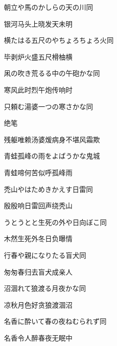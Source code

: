 \begin{haiku}
    {\FH 朝立や馬のかしらの天の川}\hfill{\FH 同}

    {\FK 银河马头上晓发天未明}
\end{haiku}

\begin{haiku}
    {\FH 横たはる五尺のやちょろちょろ火}\hfill{\FH 同}

    {\FK 毕剥炉火盛五尺榾柚横}
\end{haiku}

\begin{haiku}
    {\FH 凩の吹き荒るる中の午砲かな}\hfill{\FH 同}

    {\FK 寒风此时烈午炮传响时}
\end{haiku}

\begin{haiku}
    {\FH 只頼む湯婆一つの寒さかな}\hfill{\FH 同}

    {\FK 绝笔}

    {\FK 残躯唯赖汤婆煖病身不堪风霜欺}
\end{haiku}

\begin{haiku}
    {\FH 青蛙孤峰の雨をよばうかな}\hfill{\FH 鬼城}

    {\FK 青蛙啼何苦似呼孤峰雨}
\end{haiku}

\begin{haiku}
    {\FH 禿山やはためきかえす日雷}\hfill{\FH 同}

    {\FK 殷殷响日雷回声绕秃山}
\end{haiku}

\begin{haiku}
    {\FH うとうとと生死の外や日向ぼこ}\hfill{\FH 同}

    {\FK 木然生死外冬日负曝情}
\end{haiku}

\begin{haiku}
    {\FH 行春や親になりたる盲犬}\hfill{\FH 同}

    {\FK 匆匆春归去盲犬成亲人}
\end{haiku}

\begin{haiku}
    {\FH 沼涸れて狼渡る月夜かな}\hfill{\FH 同}

    {\FK 凉秋月色好贪狼渡涸沼}
\end{haiku}

\begin{haiku}
    {\FH 名香に酔いて春の夜ねむられず}\hfill{\FH 同}

    {\FK 名香令人醉春夜无眠中}
\end{haiku}

